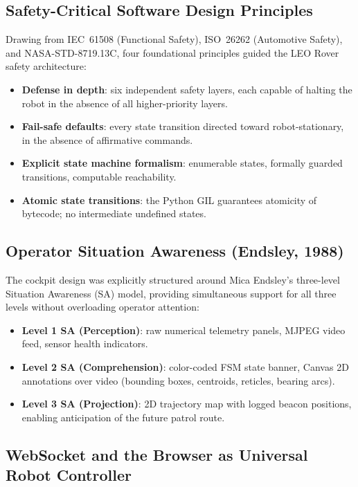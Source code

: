 \subsection{Safety-Critical Software Design Principles}

Drawing from IEC~61508 (Functional Safety), ISO~26262 (Automotive Safety), and NASA-STD-8719.13C, four foundational principles guided the LEO Rover safety architecture:

\begin{itemize}[leftmargin=1.4em]
  \item \textbf{Defense in depth}: six independent safety layers, each capable of halting the robot in the absence of all higher-priority layers.
  \item \textbf{Fail-safe defaults}: every state transition directed toward robot-stationary,  in the absence of affirmative commands.
  \item \textbf{Explicit state machine formalism}: enumerable states, formally guarded transitions, computable reachability.
  \item \textbf{Atomic state transitions}: the Python GIL guarantees atomicity of  bytecode; no intermediate undefined states.
\end{itemize}

\subsection{Operator Situation Awareness (Endsley, 1988)}

The cockpit design was explicitly structured around Mica Endsley's three-level Situation Awareness (SA) model, providing simultaneous support for all three levels without overloading operator attention:

\begin{itemize}[leftmargin=1.4em]
  \item \textbf{Level 1 SA (Perception)}: raw numerical telemetry panels, MJPEG video feed, sensor health indicators.
  \item \textbf{Level 2 SA (Comprehension)}: color-coded FSM state banner, Canvas 2D annotations over video (bounding boxes, centroids, reticles, bearing arcs).
  \item \textbf{Level 3 SA (Projection)}: 2D trajectory map with logged beacon positions, enabling anticipation of the future patrol route.
\end{itemize}

\subsection{WebSocket and the Browser as Universal Robot Controller}

